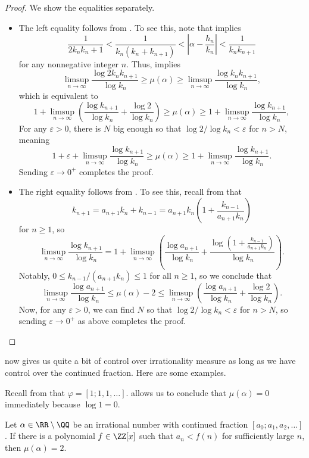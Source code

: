 \documentclass[../notes.tex]{subfiles}
\begin{document}
\begin{proof}
	We show the equalities separately.
	\begin{itemize}
		\item The left equality follows from . To see this, note that  implies
		\[\frac1{2k_nk_n+1}<\frac1{k_n(k_n+k_{n+1})}<\left|\alpha-\frac{h_n}{k_n}\right|<\frac1{k_nk_{n+1}}\]
		for any nonnegative integer $n$. Thus,  implies
		\[\limsup_{n\to\infty}\frac{\log 2k_nk_{n+1}}{\log k_n}\ge\mu(\alpha)\ge\limsup_{n\to\infty}\frac{\log k_nk_{n+1}}{\log k_n},\]
		which is equivalent to
		\[1+\limsup_{n\to\infty}\left(\frac{\log k_{n+1}}{\log k_n}+\frac{\log 2}{\log k_n}\right)\ge\mu(\alpha)\ge1+\limsup_{n\to\infty}\frac{\log k_{n+1}}{\log k_n},\]
		For any $\varepsilon>0$, there is $N$ big enough so that $\log2/\log k_n<\varepsilon$ for $n>N$, meaning
		\[1+\varepsilon+\limsup_{n\to\infty}\frac{\log k_{n+1}}{\log k_n}\ge\mu(\alpha)\ge1+\limsup_{n\to\infty}\frac{\log k_{n+1}}{\log k_n}.\]
		Sending $\varepsilon\to0^+$ completes the proof.
		\item The right equality follows from . To see this, recall from  that
		\[k_{n+1}=a_{n+1}k_n+k_{n-1}=a_{n+1}k_n\left(1+\frac{k_{n-1}}{a_{n+1}k_n}\right)\]
		for $n\ge1$, so
		\[\limsup_{n\to\infty}\frac{\log k_{n+1}}{\log k_n}=1+\limsup_{n\to\infty}\left(\frac{\log a_{n+1}}{\log k_n}+\frac{\log\left(1+\frac{k_{n-1}}{a_{n+1}k_n}\right)}{\log k_n}\right).\]
		Notably, $0\le k_{n-1}/(a_{n+1}k_n)\le1$ for all $n\ge1$, so we conclude that
		\[\limsup_{n\to\infty}\frac{\log a_{n+1}}{\log k_n}\le\mu(\alpha)-2\le\limsup_{n\to\infty}\left(\frac{\log a_{n+1}}{\log k_n}+\frac{\log2}{\log k_n}\right).\]
		Now, for any $\varepsilon>0$, we can find $N$ so that $\log2/\log k_n<\varepsilon$ for $n>N$, so sending $\varepsilon\to0^+$ as above completes the proof.
		\qedhere
	\end{itemize}
\end{proof}
 now gives us quite a bit of control over irrationality measure as long as we have control over the continued fraction. Here are some examples.
\begin{example}
	Recall from  that $\varphi=[1;1,1,\ldots]$.  allows us to conclude that $\mu(\alpha)=0$ immediately because $\log1=0$.
\end{example}
\begin{corollary} \label{cor:bounded-cf-is-mu-2}
	Let $\alpha\in\RR\setminus\QQ$ be an irrational number with continued fraction $[a_0;a_1,a_2,\ldots]$. If there is a polynomial $f\in\ZZ[x]$ such that $a_n<f(n)$ for sufficiently large $n$, then $\mu(\alpha)=2$.
\end{corollary}
\end{document}
